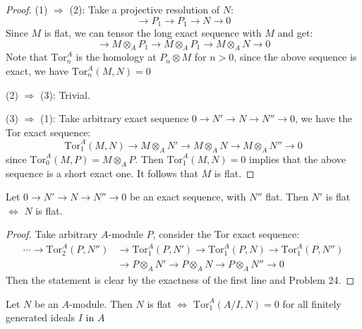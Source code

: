 \documentclass{solution}
\begin{document}
\begin{proof}
    (1) $\Rightarrow$ (2): Take a projective resolution of $N$:
    $$\rightarrow P_1 \rightarrow P_1 \rightarrow N \rightarrow 0$$
    Since $M$ is flat, we can tensor the long exact sequence with $M$ and get:
    $$\rightarrow M \otimes_A P_1 \rightarrow M \otimes_A P_1 \rightarrow M \otimes_A N \rightarrow 0$$
    Note that $\mathrm{Tor}_{n}^{A}$ is the homology at $P_{n} \otimes M$ for $n \gt 0$, since the above sequence is exact, we have $\mathrm{Tor}_{n}^{A}(M, N) = 0$

    (2) $\Rightarrow$ (3): Trivial.

    (3) $\Rightarrow$ (1): Take arbitrary exact sequence $0 \rightarrow N' \rightarrow N \rightarrow N'' \rightarrow 0$, we have the Tor exact sequence:
    $$\mathrm{Tor}_{1}^{A}(M, N) \rightarrow M \otimes_A N' \rightarrow M \otimes_A N \rightarrow M \otimes_A N'' \rightarrow 0$$
    since $\mathrm{Tor}_{0}^{A}(M, P) = M \otimes_A P$. Then $\mathrm{Tor}_{1}^{A}(M, N) = 0$ implies that the above sequence is a short exact one. It follows that $M$ is flat.
\end{proof}

\begin{problem}
    Let $0 \rightarrow N' \rightarrow N \rightarrow N'' \rightarrow 0$ be an exact sequence, with $N''$ flat. Then $N'$ is flat $\Leftrightarrow$ $N$ is flat.
\end{problem}

\begin{proof}
    Take arbitrary $A$-module $P$, consider the Tor exact sequence:
    $$
        \begin{aligned}
        \cdots \rightarrow \mathrm{Tor}_{2}^{A}(P, N'') &\rightarrow \mathrm{Tor}_{1}^{A}(P, N') \rightarrow \mathrm{Tor}_{1}^{A}(P, N) \rightarrow \mathrm{Tor}_{1}^{A}(P, N'') \\
        &\rightarrow P \otimes_A N' \rightarrow P \otimes_A N \rightarrow P \otimes_A N'' \rightarrow 0
        \end{aligned}
    $$
    Then the statement is clear by the exactness of the first line and Problem 24.
\end{proof}

\begin{problem}
    Let $N$ be an $A$-module. Then $N$ is flat $\Leftrightarrow$ $\mathrm{Tor}_{1}^{A}(A / I, N) = 0$ for all finitely generated ideals $I$ in $A$
\end{problem}
\end{document}
